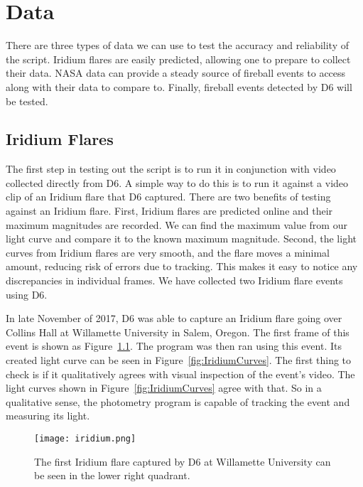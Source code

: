 \chapter{Data}

There are three types of data we can use to test the accuracy and reliability of the script. Iridium flares are easily predicted, allowing one to prepare to collect their data. NASA data can provide a steady source of fireball events to access along with their data to compare to. Finally, fireball events detected by D6 will be tested.

\section{Iridium Flares}

The first step in testing out the script is to run it in conjunction with video collected directly from D6. A simple way to do this is to run it against a video clip of an Iridium flare that D6 captured. There are two benefits of testing against an Iridium flare. First, Iridium flares are predicted online and their maximum magnitudes are recorded. We can find the maximum value from our light curve and compare it to the known maximum magnitude. Second, the light curves from Iridium flares are very smooth, and the flare moves a minimal amount, reducing risk of errors due to tracking. This makes it easy to notice any discrepancies in individual frames. We have collected two Iridium flare events using D6. 

In late November of 2017, D6 was able to capture an Iridium flare going over Collins Hall at Willamette University in Salem, Oregon. The first frame of this event is shown as Figure~\ref{fig:Iridium}. The program was then ran using this event. Its created light curve can be seen in Figure~\ref{fig:IridiumCurves}. The first thing to check is if it qualitatively agrees with visual inspection of the event's video. The light curves shown in Figure~\ref{fig:IridiumCurves} agree with that. So in a qualitative sense, the photometry program is capable of tracking the event and measuring its light. 

\begin{figure}[h!]
	\centering
	\texttt{[image: iridium.png]}
	\caption{The first Iridium flare captured by D6 at Willamette University can be seen in the lower right quadrant.}
	\label{fig:Iridium}
\end{figure}

